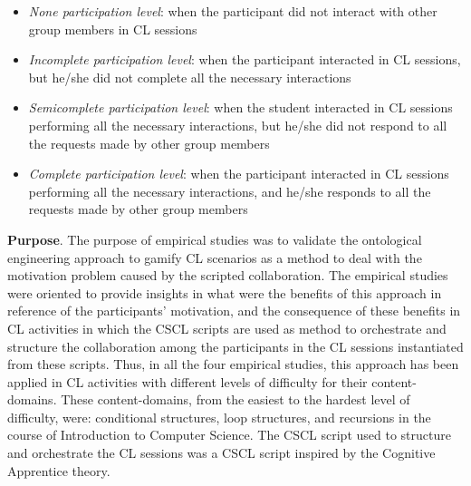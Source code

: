 \begin{itemize}
\item \emph{None participation level}: when the participant did not interact with other group members in CL sessions
\item \emph{Incomplete participation level}: when the participant interacted in CL sessions, but he/she did not complete all the necessary interactions
\item \emph{Semicomplete participation level}: when the student interacted in CL sessions performing all the necessary interactions, but he/she did not respond to all the requests made by other group members
\item \emph{Complete participation level}: when the participant interacted in CL sessions performing all the necessary interactions, and he/she responds to all the requests made by other group members
\end{itemize}
 
\textbf{Purpose}. The purpose of empirical studies was to validate the ontological engineering approach to gamify CL scenarios as a method to deal with the motivation problem caused by the scripted collaboration. 
The empirical studies were oriented to provide insights in what were the benefits of this approach in reference of the participants' motivation, and the consequence of these benefits in CL activities in which the CSCL scripts are used as method to orchestrate and structure the collaboration among the participants in the CL sessions instantiated from these scripts. Thus, in all the four empirical studies, this approach has been applied in CL activities with different levels of difficulty for their content-domains. These content-domains, from the easiest to the hardest level of difficulty, were: conditional structures, loop structures, and recursions in the course of Introduction to Computer Science. The CSCL script used to structure and orchestrate the CL sessions was a CSCL script inspired by the Cognitive Apprentice theory.

